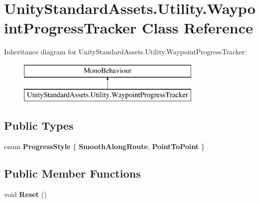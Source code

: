 \hypertarget{class_unity_standard_assets_1_1_utility_1_1_waypoint_progress_tracker}{}\section{Unity\+Standard\+Assets.\+Utility.\+Waypoint\+Progress\+Tracker Class Reference}
\label{class_unity_standard_assets_1_1_utility_1_1_waypoint_progress_tracker}
Inheritance diagram for Unity\+Standard\+Assets.\+Utility.\+Waypoint\+Progress\+Tracker\+:\begin{figure}[H]
\begin{center}
\leavevmode
\includegraphics[height=2.000000cm]{class_unity_standard_assets_1_1_utility_1_1_waypoint_progress_tracker}
\end{center}
\end{figure}
\subsection*{Public Types}
\begin{DoxyCompactItemize}
\item 
enum {\bfseries Progress\+Style} \{ {\bfseries Smooth\+Along\+Route}, 
{\bfseries Point\+To\+Point}
 \}\hypertarget{class_unity_standard_assets_1_1_utility_1_1_waypoint_progress_tracker_ab40f5f8ef7056c806da2080c360bca96}{}\label{class_unity_standard_assets_1_1_utility_1_1_waypoint_progress_tracker_ab40f5f8ef7056c806da2080c360bca96}

\end{DoxyCompactItemize}
\subsection*{Public Member Functions}
\begin{DoxyCompactItemize}
\item 
void {\bfseries Reset} ()\hypertarget{class_unity_standard_assets_1_1_utility_1_1_waypoint_progress_tracker_acb8d4867869050d7453fa0e51fee3547}{}\label{class_unity_standard_assets_1_1_utility_1_1_waypoint_progress_tracker_acb8d4867869050d7453fa0e51fee3547}

\end{DoxyCompactItemize}
